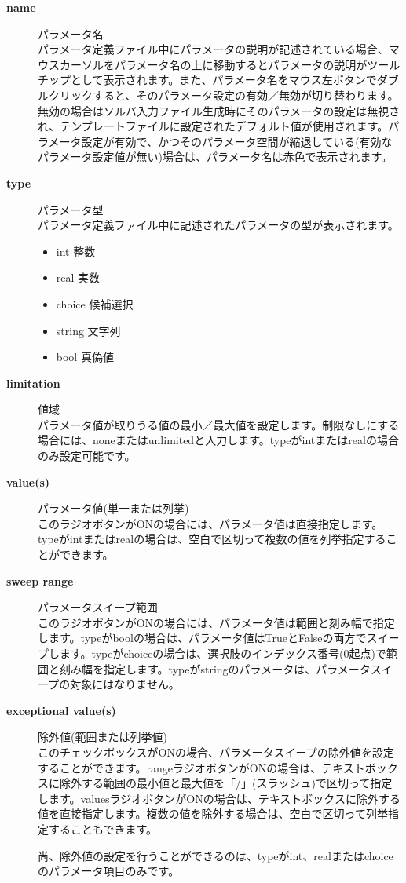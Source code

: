 \documentclass[a4paper,11pt]{jarticle}
\begin{document}
\begin{description}
\item[{\bf name}] パラメータ名\\
パラメータ定義ファイル中にパラメータの説明が記述されている場合、マウスカーソルをパラメータ名の上に移動するとパラメータの説明がツールチップとして表示されます。また、パラメータ名をマウス左ボタンでダブルクリックすると、そのパラメータ設定の有効／無効が切り替わります。無効の場合はソルバ入力ファイル生成時にそのパラメータの設定は無視され、テンプレートファイルに設定されたデフォルト値が使用されます。パラメータ設定が有効で、かつそのパラメータ空間が縮退している(有効なパラメータ設定値が無い)場合は、パラメータ名は赤色で表示されます。

\item[{\bf type}] パラメータ型\\
パラメータ定義ファイル中に記述されたパラメータの型が表示されます。
\begin{itemize}
\item int 整数
\item real 実数
\item choice 候補選択
\item string 文字列
\item bool 真偽値
\end{itemize}

\item[{\bf limitation}] 値域\\
パラメータ値が取りうる値の最小／最大値を設定します。制限なしにする場合には、noneまたはunlimitedと入力します。typeがintまたはrealの場合のみ設定可能です。

\item[{\bf value(s)}] パラメータ値(単一または列挙)\\
このラジオボタンがONの場合には、パラメータ値は直接指定します。typeがintまたはrealの場合は、空白で区切って複数の値を列挙指定することができます。

\item[{\bf sweep range}] パラメータスイープ範囲\\
このラジオボタンがONの場合には、パラメータ値は範囲と刻み幅で指定します。typeがboolの場合は、パラメータ値はTrueとFalseの両方でスイープします。typeがchoiceの場合は、選択肢のインデックス番号(0起点)で範囲と刻み幅を指定します。typeがstringのパラメータは、パラメータスイープの対象にはなりません。

\item[{\bf exceptional value(s)}] 除外値(範囲または列挙値)\\
このチェックボックスがONの場合、パラメータスイープの除外値を設定することができます。rangeラジオボタンがONの場合は、テキストボックスに除外する範囲の最小値と最大値を「/」(スラッシュ)で区切って指定します。valuesラジオボタンがONの場合は、テキストボックスに除外する値を直接指定します。複数の値を除外する場合は、空白で区切って列挙指定することもできます。

尚、除外値の設定を行うことができるのは、typeがint、realまたはchoiceのパラメータ項目のみです。
\end{description}
\end{document}
